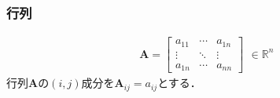 \subsubsection{行列}$$
\begin{aligned}
\mathbf{A} =\left[\begin{array}{ccc}
a_{11} & \cdots & a_{1n} \\
\vdots & \ddots & \vdots  \\
a_{1n} & \cdots & a_{nn}
\end{array}\right]
\end{aligned} \in \mathbb{R}^n
$$
行列$\mathbf{A}$の$(i, j)$成分を$\mathbf{A}_{ij}=a_{ij}$とする．